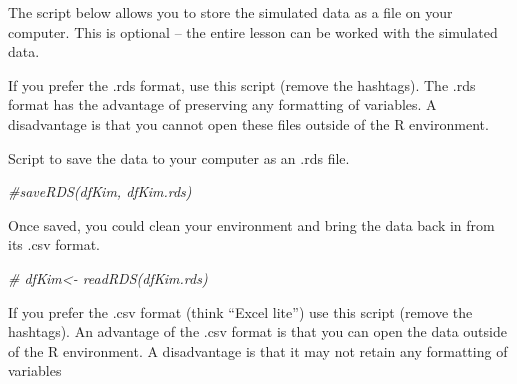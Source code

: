 \documentclass[
  11pt,
]{book}
\newenvironment{Shaded}{\begin{snugshade}}{\end{snugshade}}
\newcommand{\CommentTok}[1]{\textcolor[rgb]{0.37,0.37,0.37}{\textit{#1}}}
\newcommand{\DecValTok}[1]{\textcolor[rgb]{0.06,0.06,0.06}{#1}}
\newcommand{\FunctionTok}[1]{\textcolor[rgb]{0.27,0.27,0.27}{\textbf{#1}}}
\newcommand{\NormalTok}[1]{#1}
\newcommand{\OtherTok}[1]{\textcolor[rgb]{0.37,0.37,0.37}{#1}}
\newcommand{\SpecialCharTok}[1]{\textcolor[rgb]{0.43,0.43,0.43}{\textbf{#1}}}
\begin{document}
\begin{Shaded}
\end{Shaded}

The script below allows you to store the simulated data as a file on your computer. This is optional -- the entire lesson can be worked with the simulated data.

If you prefer the .rds format, use this script (remove the hashtags). The .rds format has the advantage of preserving any formatting of variables. A disadvantage is that you cannot open these files outside of the R environment.

Script to save the data to your computer as an .rds file.

\begin{Shaded}
\begin{Highlighting}[]
\CommentTok{\#saveRDS(dfKim, \textquotesingle{}dfKim.rds\textquotesingle{})  }
\end{Highlighting}
\end{Shaded}

Once saved, you could clean your environment and bring the data back in from its .csv format.

\begin{Shaded}
\begin{Highlighting}[]
\CommentTok{\# dfKim\textless{}{-} readRDS(\textquotesingle{}dfKim.rds\textquotesingle{})}
\end{Highlighting}
\end{Shaded}

If you prefer the .csv format (think ``Excel lite'') use this script (remove the hashtags). An advantage of the .csv format is that you can open the data outside of the R environment. A disadvantage is that it may not retain any formatting of variables
\end{document}
